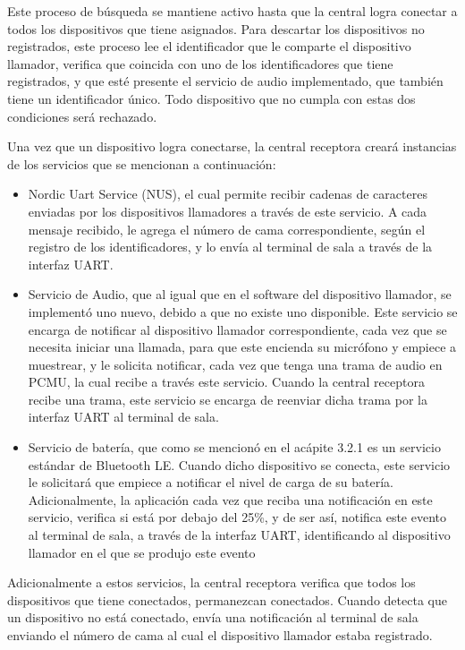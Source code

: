 Este proceso de búsqueda se mantiene activo hasta que la central logra conectar a todos los dispositivos que tiene asignados. Para descartar los dispositivos no registrados, este proceso lee el identificador que le comparte el dispositivo llamador, verifica que coincida con uno de los identificadores que tiene registrados, y que esté presente el servicio de audio implementado, que también tiene un identificador único. Todo dispositivo que no cumpla con estas dos condiciones será rechazado.

Una vez que un dispositivo logra conectarse, la central receptora creará instancias de los servicios que se mencionan a continuación:

\begin{itemize}

\item Nordic Uart Service (NUS), el cual permite recibir cadenas de caracteres enviadas por los dispositivos llamadores a través de este servicio. A cada mensaje recibido, le agrega el número de cama correspondiente, según el registro de los identificadores, y lo envía al terminal de sala a través de la interfaz UART.

\item Servicio de Audio, que al igual que en el software del dispositivo llamador, se implementó uno nuevo, debido a que no existe uno disponible. Este servicio se encarga de notificar al dispositivo llamador correspondiente, cada vez que se necesita iniciar una llamada, para que este encienda su micrófono y empiece a muestrear, y le solicita notificar, cada vez que tenga una trama de audio en PCMU, la cual recibe a través este servicio. Cuando la central receptora recibe una trama, este servicio se encarga de reenviar dicha trama por la interfaz UART al terminal de sala.

\item Servicio de batería, que como se mencionó en el acápite 3.2.1 es un servicio estándar de Bluetooth LE. Cuando dicho dispositivo se conecta, este servicio le solicitará que empiece a notificar el nivel de carga de su batería. Adicionalmente, la aplicación cada vez que reciba una notificación en este servicio, verifica si está por debajo del 25\%, y de ser así, notifica este evento al terminal de sala, a través de la interfaz UART, identificando al dispositivo llamador en el que se produjo este evento

\end{itemize}

Adicionalmente a estos servicios, la central receptora verifica que todos los dispositivos que tiene conectados, permanezcan conectados. Cuando detecta que un dispositivo no está conectado, envía una notificación al terminal de sala enviando el número de cama al cual el dispositivo llamador estaba registrado.

